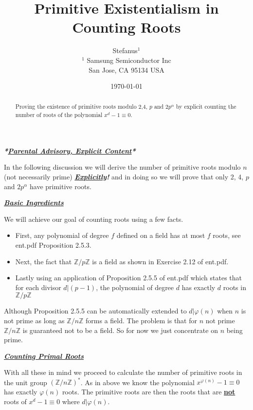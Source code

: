 \documentclass[aps,preprint,preprintnumbers,nofootinbib,showpacs,prd]{revtex4-1}
\newcommand{\bit}{\begin{itemize}}
\newcommand{\eit}{\end{itemize}}
\begin{document}
\title{Primitive Existentialism in Counting Roots}
\bigskip
\author{Stefanus$^1$\\
$^1$ Samsung Semiconductor Inc\\ San Jose, CA 95134 USA\\
}
%
\date{\today}
%
\begin{abstract}
Proving the existence of primitive roots modulo 2,4, $p$ and $2p^\alpha$ by explicit counting the number of roots of the polynomial $x^d - 1\equiv 0$.

\end{abstract}
%
\maketitle

\renewcommand{\theequation}{A.\arabic{equation}}  %
\setcounter{equation}{0}  %

\textbf{\textit{*}}\underline{\textit{\textbf {Parental Advisory, Explicit Content}}}\textbf{\textit{*}}

In the following discussion we will derive the number of primitive roots modulo $n$ (not necessarily prime) \underline{\textbf{\textit{Explicitly}}}\textbf{\textit{!}} and in doing so we will prove that only 2, 4, $p$ and $2p^\alpha$ have primitive roots.

\bigskip
\underline{\textit{\textbf{Basic Ingredients}}}
\bigskip

We will achieve our goal of counting roots using a few facts.
\bit
%
\item First, any polynomial of degree $f$ defined on a field has at most $f$ roots, see ent.pdf Proposition 2.5.3.
%
\item Next, the fact that $\mathbb{Z}/p\mathbb{Z}$ is a field as shown in Exercise 2.12 of ent.pdf.
%
\item Lastly using an application of Proposition 2.5.5 of ent.pdf which states that for each divisor $d|(p-1)$, the polynomial of degree $d$ has exactly $d$ roots in $\mathbb{Z}/p\mathbb{Z}$
%
\eit
%
Although Proposition 2.5.5 can be automatically extended to $d|\varphi(n)$ when $n$ is not prime as long as $\mathbb{Z}/n\mathbb{Z}$ forms a field. The problem is that for $n$ not prime $\mathbb{Z}/n\mathbb{Z}$ is guaranteed not to be a field. So for now we just concentrate on $n$ being prime.

\bigskip
\underline{\textit{\textbf{Counting Primal Roots}}}
\bigskip

With all these in mind we proceed to calculate the number of primitive roots in the unit group $(\mathbb{Z}/n\mathbb{Z})^*$. As in above we know the polynomial $x^{\varphi(n)} - 1 \equiv 0$ has exactly $\varphi(n)$ roots. The primitive roots are then the roots that are \underline{{\bf not}} roots of $x^d - 1 \equiv 0$ where $d|\varphi(n)$.
\end{document}
